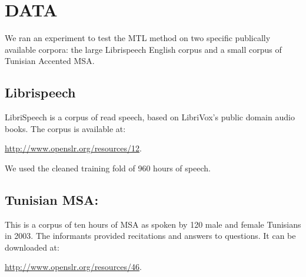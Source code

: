 \section{DATA}
\label{sec-3}

We ran an experiment to test the \gls{MTL} method on two specific publically available corpora: the large Librispeech English corpus and a small corpus of Tunisian Accented \gls{MSA}. 



\subsection{Librispeech}
\label{sec-3-1}
LibriSpeech is a corpus of read speech, based on LibriVox's public domain audio books.
The corpus is available at:

\url{http://www.openslr.org/resources/12}.

We used the cleaned training fold of 960 hours of speech. 

\subsection{Tunisian \gls{MSA}:}
\label{sec-3-2}
This is a corpus of ten hours of \gls{MSA} as spoken by 120 male and female Tunisians in 2003. 
The informants provided recitations and answers to questions. 
It can be downloaded at:

\url{http://www.openslr.org/resources/46}.
